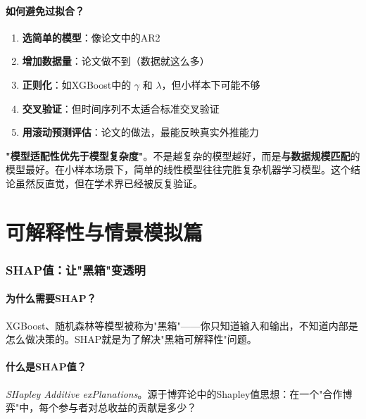 \documentclass[12pt, a4paper]{article}
\begin{document}
\subsection{如何避免过拟合？}

\begin{enumerate}[leftmargin=2em]
\item \textbf{选简单的模型}：像论文中的AR2
\item \textbf{增加数据量}：论文做不到（数据就这么多）
\item \textbf{正则化}：如XGBoost中的 $\gamma$ 和 $\lambda$，但小样本下可能不够
\item \textbf{交叉验证}：但时间序列不太适合标准交叉验证
\item \textbf{用滚动预测评估}：论文的做法，最能反映真实外推能力
\end{enumerate}

\begin{purplebox}[论文的核心方法论启示]
\textbf{"模型适配性优先于模型复杂度"}。不是越复杂的模型越好，而是\textbf{与数据规模匹配}的模型最好。在小样本场景下，简单的线性模型往往完胜复杂机器学习模型。这个结论虽然反直觉，但在学术界已经被反复验证。
\end{purplebox}

\part{可解释性与情景模拟篇}

\section{SHAP值：让"黑箱"变透明}

\subsection{为什么需要SHAP？}

XGBoost、随机森林等模型被称为"黑箱"——你只知道输入和输出，不知道内部是怎么做决策的。SHAP就是为了解决"黑箱可解释性"问题。

\subsection{什么是SHAP值？}

\begin{conceptbox}[SHAP]
\textit{SHapley Additive exPlanations}。源于博弈论中的Shapley值思想：在一个"合作博弈"中，每个参与者对总收益的贡献是多少？
\end{conceptbox}
\end{document}
